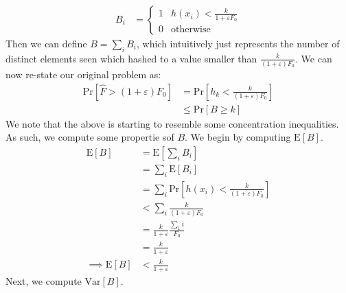 \documentclass[12pt]{exam}
\newcommand*{\prob}[1]{\text{Pr} \left[ #1 \right]}
\newcommand*{\ex}[1]{\text{E} \left[ #1 \right]}
\newcommand*{\var}[1]{\text{Var} \left[ #1 \right]}
\newcommand*{\eps}{\varepsilon}  %
\begin{document}
\begin{questions}
\begin{parts}
\begin{solution}
\begin{align*}
B_i &= 
  \begin{cases}
    1 & h(x_i) < \frac{k}{1+\eps F_0} \\
    0  & \text{otherwise}
  \end{cases}
\end{align*}
Then we can define $B = \sum_{i} B_i$, which intuitively just represents the number of distinct elements seen which hashed to a value smaller than $\frac{k}{(1+ \eps)F_0}$. We can now re-state our original problem as:
\begin{align*}
  \prob{\hat{F} > (1+\eps) F_0} &= \prob{h_k < \frac{k}{(1+\eps)F_0}} \\
  &\leq \prob{B \geq k}
\end{align*}
We note that the above is starting to resemble some concentration inequalities. As such, we compute some propertie sof $B$. We begin by computing $\ex{B}$.
\begin{align*}
  \ex{B} &= \ex{\sum_{i} B_i} \\
  &= \sum_{i} \ex{B_i} \tag{Linearlity of expectation} \\
  &= \sum_{i} \prob{h(x_i) < \frac{k}{(1 + \eps)F_0}} \\
  &< \sum_{i} \frac{k}{(1 + \eps)F_0} \tag{By distribution property of $h$} \\
  &= \frac{k}{1 + \eps} \frac{\sum_{1} i}{F_0} \\
  &= \frac{k}{1+\eps} \tag{We're summing over distinct $x_i$, so we have $\sum_i 1 = F_0$} \\
\implies \ex{B} &< \frac{k}{1 + \eps}
\end{align*}
Next, we compute $\var{B}$.


\end{solution}
\end{parts}
\end{questions}
\end{document}
